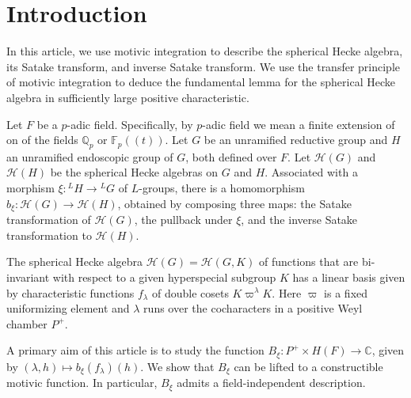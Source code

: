 
% 
% 


\newcommand{\XX}[1]{{\it  [To do: #1]}}
\newcommand{\ring}[1]{\mathbb{#1}}
\newcommand{\g}[1]{\langle{#1}\rangle}
\def\op#1{{\operatorname{#1}}}
\def\inv{\op{inv}}
\def\dom{P^+}
\def\Q{{\ring{Q}}}
\def\card{\op{card}}

\def\C{\mathcal C}
\def\N{\mathcal N}
\def\H{\mathcal H}
\def\M{\mathcal M}
\def\T{\mathcal T}

\def\n{{\mathfrak n}}


\def\libel#1{{\text{\sc [#1]~}}\label{#1}}
\def\rif#1{(\ref{#1}-{\text{\sc #1})}}



\section{Introduction}\libel{XX} %

In this article, we use motivic integration to describe the spherical
Hecke algebra, its Satake transform, and inverse Satake transform.
We use the transfer principle of motivic integration to deduce the fundamental
lemma for the spherical Hecke algebra in sufficiently large positive characteristic.

Let $F$ be a $p$-adic field.  Specifically, 
by $p$-adic field we mean a finite extension of on of the fields $\ring{Q}_p$ or $\ring{F}_p((t))$.
Let $G$ be an unramified reductive group and $H$ an unramified endoscopic group of $G$, both defined over $F$.
Let $\H(G)$ and $\H(H)$ be the spherical Hecke algebras on $G$ and $H$.
Associated with  a morphism $\xi:{}^LH\to {}^LG$ of $L$-groups, there is a homomorphism
$b_\xi:\H(G)\to \H(H)$, obtained by composing three maps: the Satake transformation of $\H(G)$,
the pullback under $\xi$, and the inverse Satake transformation to $\H(H)$.

The spherical Hecke algebra $\H(G)=\H(G,K)$ of functions that are bi-invariant with respect
to a given hyperspecial subgroup $K$ has a linear basis given by characteristic functions $f_\lambda$
of double cosets $K\varpi^\lambda K$.  Here $\varpi$ is a fixed uniformizing element and $\lambda$
runs over the cocharacters in a positive Weyl chamber $P^+$.

A primary aim of this article is to study the function $B_\xi:P^+\times H(F)\to \ring{C}$, given by
$(\lambda,h)\mapsto b_\xi(f_\lambda)(h)$.   We show that $B_\xi$ can be lifted to a constructible motivic
function.   In particular, $B_\xi$ admits a field-independent description.  

